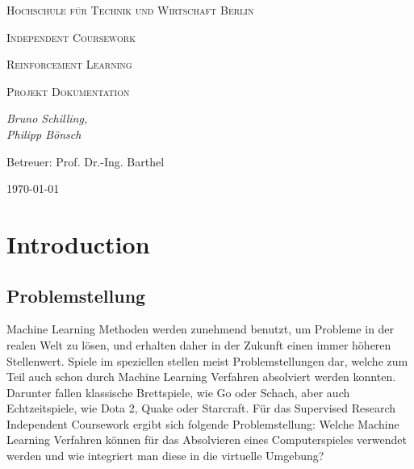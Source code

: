 \documentclass[11pt]{scrartcl}
\begin{document}

\begin{titlepage}
	\centering
	{\scshape\LARGE Hochschule für Technik und Wirtschaft Berlin \par}
	\vspace{2cm}
	{\Huge \scshape{Independent Coursework}\par}
	\vspace{2cm}
	{\LARGE \scshape{Reinforcement Learning}\par}
	{\scshape\Large Projekt Dokumentation\par}
	\vspace{4cm}
	{\large\itshape Bruno Schilling,\\Philipp Bönsch\par}
	\vfill
	
	{\large Betreuer: Prof. Dr.-Ing. Barthel \par}
	\vspace{1cm}
	{\large \today\par}
\end{titlepage}

\lstset{basicstyle=\ttfamily\small,breaklines=true}
\newpage
\tableofcontents
\newpage
\section{Introduction}

\subsection{Problemstellung}
Machine Learning Methoden werden zunehmend benutzt, um Probleme in der realen Welt zu
lösen, und erhalten daher in der Zukunft einen immer höheren Stellenwert. Spiele im
speziellen stellen meist Problemstellungen dar, welche zum Teil auch schon durch Machine
Learning Verfahren absolviert werden konnten. Darunter fallen klassische Brettspiele, wie Go
oder Schach\cite{DM2018}, aber auch Echtzeitspiele, wie Dota 2\cite{OA2019},
Quake\cite{DM2019} oder Starcraft\cite{DM2019_2}. Für das Supervised Research Independent Coursework
ergibt sich folgende Problemstellung: Welche Machine Learning Verfahren können für das
Absolvieren eines Computerspieles verwendet werden und wie integriert man diese in die
virtuelle Umgebung?
\end{document}
